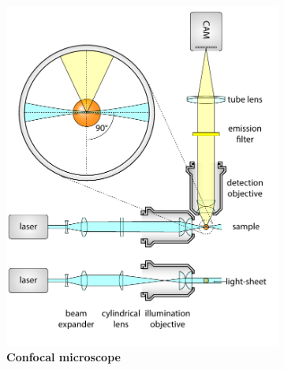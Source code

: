    \begin{figure}[tb]
    \begin{subfigure}[t]{0.49\textwidth}
      \centering
      \includegraphics[page=3,width=\textwidth]{spim_cyl}
      \caption{\textbf{Confocal microscope}}
      \label{fig:confocal}
    \end{subfigure}
    \begin{subfigure}[t]{0.49\textwidth}
      \centering

\end{subfigure}
\end{figure}
